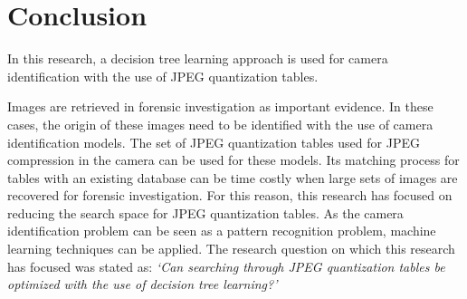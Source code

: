 \chapter{Conclusion} %
\label{ch:cncl} %


In this research, a decision tree learning approach is used for camera identification with the use of JPEG quantization tables. 

Images are retrieved in forensic investigation as important evidence. In these cases, the origin of these images need to be identified with the use of camera identification models. The set of JPEG quantization tables used for JPEG compression in the camera can be used for these models. Its matching process for tables with an existing database can be time costly when large sets of images are recovered for forensic investigation. For this reason, this research has focused on reducing the search space for JPEG quantization tables. As the camera identification problem can be seen as a pattern recognition problem, machine learning techniques can be applied. The research question on which this research has focused was stated as: \textit{`Can searching through JPEG quantization tables be optimized with the use of decision tree learning?'}


